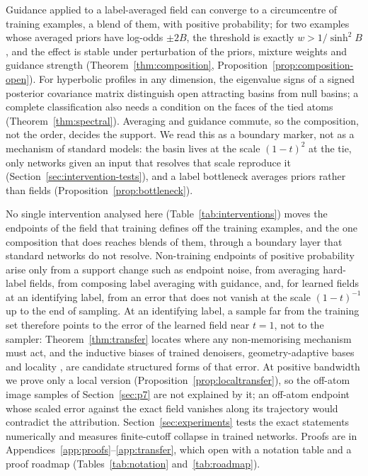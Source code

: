 \documentclass{article} %
\newif\ificlr
\theoremstyle{plain}
\theoremstyle{definition}
\theoremstyle{remark}
\begin{document}
\begin{itemize}
  Guidance applied to a label-averaged field can converge to a circumcentre of training examples,
  a blend of them, with positive probability; for two examples whose averaged priors have log-odds
  $\pm2B$, the threshold is exactly $w>1/\sinh^2B$, and the effect is stable under perturbation of
  the priors, mixture weights and guidance strength (Theorem~\ref{thm:composition},
  Proposition~\ref{prop:composition-open}). For hyperbolic profiles in any dimension, the
  eigenvalue signs of a signed posterior covariance matrix distinguish open attracting basins
  from null basins; a complete classification also needs a condition on the faces of the tied
  atoms (Theorem~\ref{thm:spectral}). Averaging and guidance commute, so the composition, not the
  order, decides the support. We read this as a boundary marker, not as a mechanism of
  standard models: the basin lives at the scale $(1-t)^2$ at the tie, only networks given an
  input that resolves that scale reproduce it (Section~\ref{sec:intervention-tests}), and a label
  bottleneck averages priors rather than fields (Proposition~\ref{prop:bottleneck}).
\end{itemize}
No single intervention analysed here (Table~\ref{tab:interventions}) moves the endpoints of the
field that training defines off the training examples, and the one composition that does reaches
blends of them, through a boundary layer that standard networks do not resolve.\ificlr\else{} Non-training endpoints of positive
probability arise only from a support change such as endpoint noise, from averaging hard-label
fields, from composing label averaging with guidance, and, for learned fields at an identifying
label, from an error that does not vanish at the scale $(1-t)^{-1}$ up to the end of sampling.\fi{} At
an identifying label, a sample far from the training set therefore points to the error of the
learned field near $t=1$, not to the sampler: Theorem~\ref{thm:transfer} locates where any
non-memorising mechanism must act, and the inductive biases of trained denoisers\ificlr{}
\citep{kadkhodaie2024generalization,kamb2024creativity,niedoba2024mechanistic}\else, geometry-adaptive
bases \citep{kadkhodaie2024generalization} and locality
\citep{kamb2024creativity,niedoba2024mechanistic},\fi{} are candidate structured forms of that error.
At positive bandwidth we prove only a local version (Proposition~\ref{prop:localtransfer}), so the
off-atom image samples of Section~\ref{sec:p7} are not explained by it; an off-atom endpoint whose
scaled error against the exact field vanishes along its trajectory would contradict the
attribution. Section~\ref{sec:experiments} tests the exact statements numerically and measures
finite-cutoff collapse in trained networks. Proofs are in
Appendices~\ref{app:proofs}--\ref{app:transfer}, which open with a notation table and a proof
roadmap (Tables~\ref{tab:notation} and~\ref{tab:roadmap}).
\end{document}
